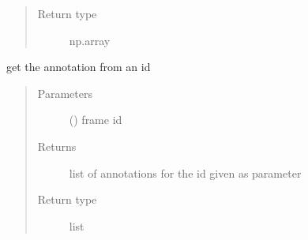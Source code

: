 \documentclass[letterpaper,10pt,english]{sphinxmanual}
\begin{document}
\begin{fulllineitems}
\begin{fulllineitems}
\begin{quote}
\begin{description}
\item[{Return type}] \leavevmode
np.array

\end{description}\end{quote}

\end{fulllineitems}


\begin{fulllineitems}
\label{\detokenize{radiate:radiate.Sequence.draw_boundingbox_rot}}
\end{fulllineitems}


\begin{fulllineitems}
\label{\detokenize{radiate:radiate.Sequence.get_annotation_from_id}}
get the annotation from an id
\begin{quote}\begin{description}
\item[{Parameters}] \leavevmode
{} () \textendash{} frame id

\item[{Returns}] \leavevmode
list of annotations for the id given as parameter

\item[{Return type}] \leavevmode
list

\end{description}\end{quote}

\end{fulllineitems}



\end{fulllineitems}
\end{document}
